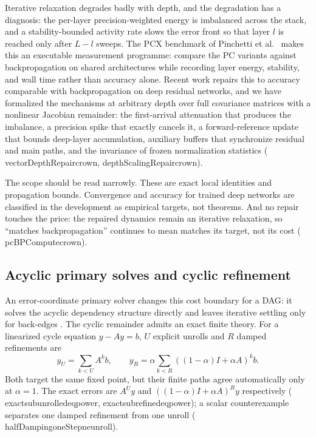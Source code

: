\documentclass[11pt]{article}
\newcommand{\leanname}[1]{{\scriptsize\ttfamily
  \def\_{\textunderscore\allowbreak}#1}}
\begin{document}
Iterative relaxation degrades badly with depth, and the degradation has a diagnosis: the
per-layer precision-weighted energy is imbalanced across the stack, and a stability-bounded
activity rate slows the error front so that layer $l$ is reached only after $L-l$ sweeps.
The PCX benchmark of Pinchetti et al.~\cite{pinchetti2024pcx} makes this an
executable measurement programme: compare the PC variants against
backpropagation on shared architectures while recording layer energy,
stability, and wall time rather than accuracy alone.
Recent work repairs this to accuracy comparable with backpropagation on deep residual
networks, and we have formalized the mechanisms at arbitrary depth over full covariance
matrices with a nonlinear Jacobian remainder: the first-arrival attenuation that produces
the imbalance, a precision spike that exactly cancels it, a forward-reference update that
bounds deep-layer accumulation, auxiliary buffers that synchronize residual and main paths,
and the invariance of frozen normalization statistics
(\leanname{vectorDepthRepair\_crown}, \leanname{depthScalingRepair\_crown}).

The scope should be read narrowly. These are exact local identities and propagation
bounds. Convergence and accuracy for trained deep networks are classified in the
development as empirical targets, not theorems. And no repair touches the price: the
repaired dynamics remain an iterative relaxation, so ``matches backpropagation'' continues
to mean matches its target, not its cost (\leanname{pcBPCompute\_crown}).

\subsection{Acyclic primary solves and cyclic refinement}

An error-coordinate primary solver changes this cost boundary for a DAG: it solves the
acyclic dependency structure directly and leaves iterative settling only for back-edges
\cite{goemaere2026epc}.  The cyclic remainder admits an exact finite theory.  For a
linearized cycle equation $y-Ay=b$, $U$ explicit unrolls and $R$ damped refinements are
\[
 y_U=\sum_{k<U}A^k b,
 \qquad
 y_R=\alpha\sum_{k<R}((1-\alpha)I+\alpha A)^k b.
\]
Both target the same fixed point, but their finite paths agree automatically only at
$\alpha=1$.  The exact errors are $A^Uy$ and
$((1-\alpha)I+\alpha A)^Ry$ respectively
(\leanname{exact\_sub\_unrolled\_eq\_power},
\leanname{exact\_sub\_refined\_eq\_power}); a scalar counterexample separates one
damped refinement from one unroll
(\leanname{halfDamping\_oneStep\_ne\_unroll}).
\end{document}
